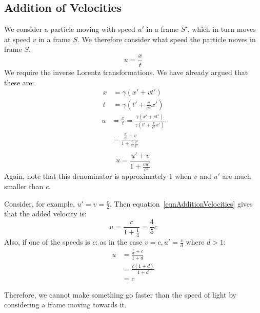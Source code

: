 \documentclass[../Main.tex]{subfiles}
\begin{document}
\subsection{Addition of Velocities}
We consider a particle moving with speed $u'$ in a frame $S'$, which in turn moves at speed $v$ in a frame $S$. We therefore consider what speed the particle moves in frame $S$.
\begin{equation*}
    u = \frac{x}{t}
\end{equation*}
We require the inverse Lorentz transformations. We have already argued that these are:
\begin{align*}
    x &= \gamma (x' + vt') \\
    t &= \gamma (t' + \frac{v}{c^2}x')
\end{align*}
\begin{align*}
    u &= \frac{x}{t} = \frac{\gamma(x' + vt')}{\gamma(t' + \frac{v}{c^2}x')} \\
    &= \frac{\frac{x'}{t'} + v}{1 + \frac{v}{c^2}\frac{x'}{t'}} \\
\end{align*}
\begin{equation}
    u = \frac{u' + v}{1 + \frac{vu'}{c^2}}
    \label{eqnAdditionVelocities}
\end{equation}
Again, note that this denominator is approximately 1 when $v$ and $u'$ are much smaller than $c$.
\begin{example}
    Consider, for example, $u' = v = \frac{c}{2}$. Then equation~\ref{eqnAdditionVelocities} gives that the added velocity is:
    \begin{equation*}
        u = \frac{c}{1 + \frac{1}{4}} = \frac{4}{5} c
    \end{equation*}
    Also, if one of the speeds is $c$: as in the case $v = c, u' = \frac{c}{d}$ where $d > 1$:
    \begin{align*}
        u &= \frac{\frac{c}{d} + c}{1 + d} \\
        &= \frac{c(1 + d)}{1 + d} \\
        &= c
    \end{align*}
\end{example}
Therefore, we cannot make something go faster than the speed of light by considering a frame moving towards it.
\end{document}
